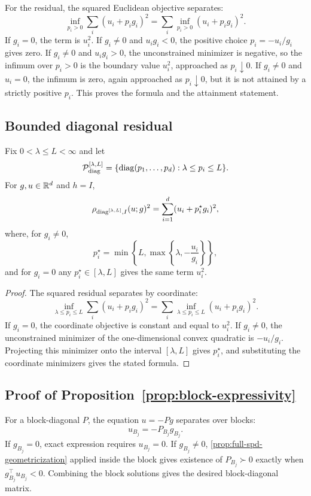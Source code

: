 For the residual, the squared Euclidean objective separates:
\[
\inf_{p_i>0}\sum_i (u_i+p_i g_i)^2
=
\sum_i \inf_{p_i>0}(u_i+p_i g_i)^2 .
\]
If $g_i=0$, the term is $u_i^2$.  If $g_i\neq0$ and $u_i g_i<0$, the
positive choice $p_i=-u_i/g_i$ gives zero.  If $g_i\neq0$ and $u_i g_i>0$,
the unconstrained minimizer is negative, so the infimum over $p_i>0$ is the
boundary value $u_i^2$, approached as $p_i\downarrow0$.  If $g_i\neq0$ and
$u_i=0$, the infimum is zero, again approached as $p_i\downarrow0$, but it is
not attained by a strictly positive $p_i$.  This proves the formula and the
attainment statement.

\subsection{Bounded diagonal residual}

\begin{proposition}
\label{prop:bounded-diagonal-residual}
Fix $0<\lambda\le L<\infty$ and let
\[
\mathcal P_{\rm diag}^{[\lambda,L]}
=
\{\operatorname{diag}(p_1,\ldots,p_d):\lambda\le p_i\le L\}.
\]
For $g,u\in\mathbb R^d$ and $h=I$,
\[
\rho_{{\rm diag}^{[\lambda,L]},I}(u;g)^2
=
\sum_{i=1}^d (u_i+p_i^\star g_i)^2,
\]
where, for $g_i\neq0$,
\[
p_i^\star
=
\min\!\left\{L,\max\!\left\{\lambda,-\frac{u_i}{g_i}\right\}\right\},
\]
and for $g_i=0$ any $p_i^\star\in[\lambda,L]$ gives the same term
$u_i^2$.
\end{proposition}

\begin{proof}
The squared residual separates by coordinate:
\[
\inf_{\lambda\le p_i\le L}\sum_i (u_i+p_i g_i)^2
=
\sum_i \inf_{\lambda\le p_i\le L}(u_i+p_i g_i)^2 .
\]
If $g_i=0$, the coordinate objective is constant and equal to $u_i^2$.  If
$g_i\neq0$, the unconstrained minimizer of the one-dimensional convex
quadratic is $-u_i/g_i$.  Projecting this minimizer onto the interval
$[\lambda,L]$ gives $p_i^\star$, and substituting the coordinate minimizers
gives the stated formula.
\end{proof}

\subsection{Proof of Proposition~\ref{prop:block-expressivity}}

For a block-diagonal $P$, the equation $u=-Pg$ separates over blocks:
\[
u_{B_j}=-P_{B_j}g_{B_j}.
\]
If $g_{B_j}=0$, exact expression requires $u_{B_j}=0$.  If $g_{B_j}\neq0$,
\cref{prop:full-spd-geometricization} applied inside the block gives
existence of $P_{B_j}\succ0$ exactly when
$g_{B_j}^\top u_{B_j}<0$.  Combining the block solutions gives the desired
block-diagonal matrix.
